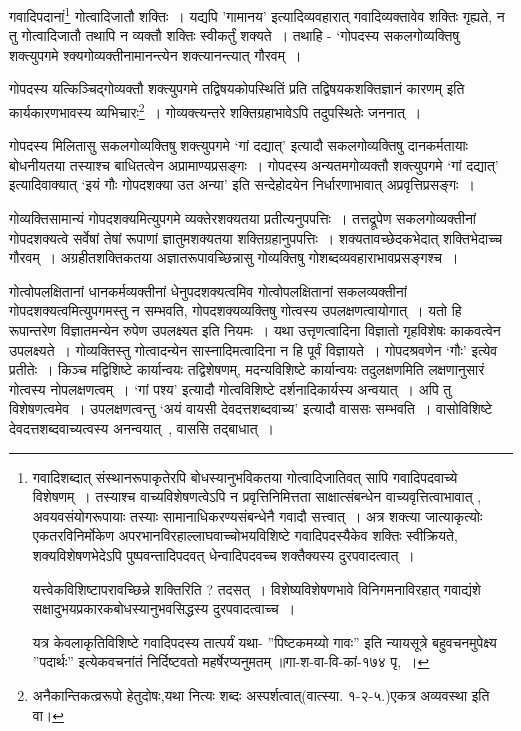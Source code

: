 			गवादिपदानां\footnote{गवादिशब्दात् संस्थानरूपाकृतेरपि  बोधस्यानुभविकतया गोत्वादिजातिवत् सापि गवादिपदवाच्ये विशेषणम्~। तस्याश्च  वाच्यविशेषणत्वेऽपि न प्रवृत्तिनिमित्तता साक्षात्संबन्धेन  वाच्यवृत्तित्वाभावात् , अवयवसंयोगरूपायाः  तस्याः सामानाधिकरण्यसंबन्धेनै  गवादौ सत्त्वात्~।  अत्र शक्त्या जात्याकृत्योः एकतरविनिर्मोकेण  अपरभानविरहाल्लाघवाच्चोभयविशिष्टे  गवादिपदस्यैकेव शक्तिः  स्वीक्रियते, शक्यविशेषणभेदेऽपि पुष्पवन्तादिपदवत्  धेन्वादिपदवच्च  शक्तैक्यस्य  दुरपवादत्वात्~।
			
			यत्त्वेकविशिष्टापरावच्छिन्ने  शक्तिरिति ? तदसत्~। विशेष्यविशेषणभावे विनिगमनाविरहात्  गवाद्यंशे सक्षादुभयप्रकारकबोधस्यानुभवसिद्धस्य  दुरपवादत्वाच्च~।

			यत्र केवलाकृतिविशिष्टे  गवादिपदस्य  तात्पर्यं यथा- ”पिष्टकमय्यो गावः” इति न्यायसूत्रे बहुवचनमुपेक्ष्य  ”पदार्थः” इत्येकवचनांतं निर्दिष्टवतो महर्षेरप्यनुमतम् ॥गा-श-वा-वि-कां-१७४ पृ,~।} गोत्वादिजातौ शक्तिः~। यद्यपि 'गामानय' इत्यादिव्यवहारात् गवादिव्यक्तावेव शक्तिः गृह्यते, न तु गोत्वादिजातौ तथापि न व्यक्तौ शक्तिः स्वीकर्तुं शक्यते~। तथाहि - ‘गोपदस्य सकलगोव्यक्तिषु  शक्त्युपगमे श्क्यगोव्यक्तीनामानन्त्येन शक्त्यानन्त्यात् गौरवम्~।

			गोपदस्य यत्किञ्चिद्गोव्यक्तौ शक्त्युपगमे तद्विषयकोपस्थितिं प्रति तद्विषयकशक्तिज्ञानं कारणम् इति  कार्यकारणभावस्य व्यभिचारः\footnote{अनैकान्तिकत्व्ररूपो हेतुदोषः,यथा नित्यः शब्दः अस्पर्शत्वात्(वात्स्या. १-२-५.)एकत्र अव्यवस्था इति वा।}~। गोव्यक्त्यन्तरे शक्तिग्रहाभावेऽपि तदुपस्थितेः जननात्~।

			गोपदस्य मिलितासु सकलगोव्यक्तिषु शक्त्युपगमे ‘गां दद्यात्' इत्यादौ सकलगोव्यक्तिषु दानकर्मतायाः बोधनीयतया तस्याश्च बाधितत्वेन अप्रामाण्यप्रसङ्गः~।	गोपदस्य अन्यतमगोव्यक्तौ शक्त्युपगमे ‘गां दद्यात्' इत्यादिवाक्यात् ‘इयं गौः गोपदशक्या उत अन्या' इति सन्देहोदयेन निर्धारणाभावात्  अप्रवृत्तिप्रसङ्गः~।
	
			गोव्यक्तिसामान्यं गोपदशक्यमित्युपगमे व्यक्तेरशक्यतया प्रतीत्यनुपपत्तिः~। तत्तद्रूपेण सकलगोव्यक्तीनां गोपदशक्यत्वे सर्वेषां तेषां रूपाणां ज्ञातुमशक्यतया शक्तिग्रहानुपपत्तिः~। शक्यतावच्छेदकभेदात् शक्तिभेदाच्च गौरवम्~। अग्रहीतशक्तिकतया अज्ञातरूपावच्छिन्नासु गोव्यक्तिषु गोशब्दव्यवहाराभावप्रसङ्गश्च~।

			गोत्वोपलक्षितानां धानकर्मव्यक्तीनां धेनुपदशक्यत्वमिव गोत्वोपलक्षितानां सकलव्यक्तीनां गोपदशक्यत्वमित्युपगमस्तु न सम्भवति, गोपदशक्यव्यक्तिषु गोत्वस्य उपलक्षणत्वायोगात्~। यतो हि रूपान्तरेण विज्ञातमन्येन रुपेण उपलक्ष्यत इति नियमः~। यथा उत्तृणत्वादिना विज्ञातो गृहविशेषः काकवत्वेन उपलक्ष्यते~। गोव्यक्तिस्तु  गोत्वादन्येन सास्नादिमत्वादिना न हि पूर्वं विज्ञायते~। गोपदश्रवणेन ‘गौः' इत्येव प्रतीतेः~। किञ्च मद्विशिष्टे कार्यान्वयः तद्विशेषणम्, मदन्यविशिष्टे कार्यान्वयः तदुलक्षणमिति लक्षणानुसारं गोत्वस्य नोपलक्षणत्वम्~। ‘गां पश्य' इत्यादौ गोत्वविशिष्टे दर्शनादिकार्यस्य अन्वयात्~। अपि तु विशेषणत्वमेव~। उपलक्षणत्वन्तु ‘अयं वायसी देवदत्तशब्दवाच्य' इत्यादौ वाससः सम्भवति~। वासोविशिष्टे देवदत्तशब्दवाच्यत्वस्य अनन्वयात्~, वाससि तद्बाधात्~। 


